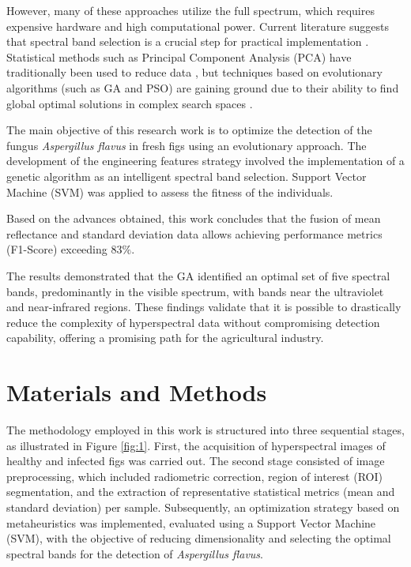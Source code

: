 \documentclass[ASNA,twocolumn]{USG}
\begin{document}
However, many of these approaches utilize the full spectrum, which requires expensive hardware and high computational power. 
Current literature suggests that spectral band selection is a crucial step for practical implementation \cite{sawant_survey_2020}. 
Statistical methods such as Principal Component Analysis (PCA) have traditionally been used to reduce data \cite{chu_classifying_2020}, but techniques based on evolutionary algorithms (such as GA and PSO) are gaining ground due to their ability to find global optimal solutions in complex search spaces \cite{sawant_survey_2020}.

The main objective of this research work is to optimize the detection of the fungus \textit{Aspergillus flavus} in fresh figs using an evolutionary approach. The development of the engineering features strategy involved the implementation of a genetic algorithm as an intelligent spectral band selection. Support Vector Machine (SVM) was applied to assess the fitness of the individuals.

Based on the advances obtained, this work concludes that the fusion of mean reflectance and standard deviation data allows achieving performance metrics (F1-Score) exceeding $83\%$. %

The results demonstrated that the GA identified an optimal set of five spectral bands, predominantly in the visible spectrum, with bands near the ultraviolet and near-infrared regions.
These findings validate that it is possible to drastically reduce the complexity of hyperspectral data without compromising detection capability, offering a promising path for the agricultural industry.

\section{Materials and Methods}

The methodology employed in this work is structured into three sequential stages, as illustrated in Figure \ref{fig:1}. 
First, the acquisition of hyperspectral images of healthy and infected figs was carried out. 
The second stage consisted of image preprocessing, which included radiometric correction, region of interest (ROI) segmentation, and the extraction of representative statistical metrics (mean and standard deviation) per sample. 
Subsequently, an optimization strategy based on metaheuristics was implemented, evaluated using a Support Vector Machine (SVM), with the objective of reducing dimensionality and selecting the optimal spectral bands for the detection of \textit{Aspergillus flavus}.
\end{document}
